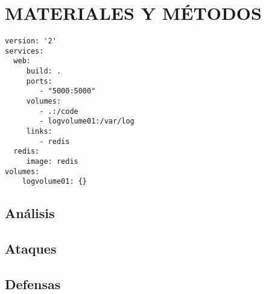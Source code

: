 \chapter{MATERIALES Y MÉTODOS}

\begin{lstlisting}[language=docker-compose-2,caption={Example docker-compose.yml},breaklines=true,label={code:compose}]
version: '2'
services:
  web:
     build: .
     ports:
        - "5000:5000"
     volumes:
        - .:/code
        - logvolume01:/var/log
     links:
        - redis
  redis:
     image: redis
volumes:
    logvolume01: {}
\end{lstlisting}


\section{Análisis}

\section{Ataques}

\section{Defensas}

